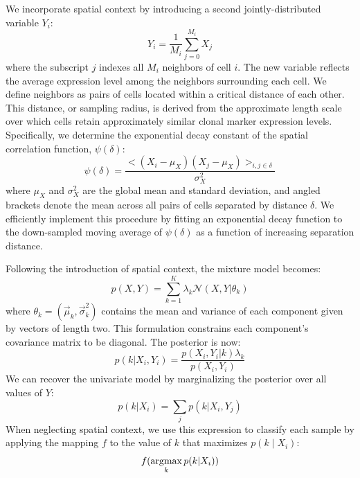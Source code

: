 We incorporate spatial context by introducing a second jointly-distributed variable $Y_i$:
\begin{equation}
Y_i = \frac{1}{M_i} \sum^{M_i}_{j=0} X_j
\end{equation}
where the subscript $j$ indexes all $M_i$ neighbors of cell $i$. The new variable reflects the average expression level among the neighbors surrounding each cell. We define neighbors as pairs of cells located within a critical distance of each other. This distance, or sampling radius, is derived from the approximate length scale over which cells retain approximately similar clonal marker expression levels. Specifically, we determine the exponential decay constant of the spatial correlation function, $\psi (\delta)$:
\begin{equation}
\psi(\delta) = \frac {<( X_i -\mu_{X})( X_j -\mu_{X})>_{i,j \in \delta}} {\sigma_X^2}
\end{equation}
where $\mu_X$ and $\sigma_X^2$ are the global mean and standard deviation, and angled brackets denote the mean across all pairs of cells separated by distance $\delta$. We efficiently implement this procedure by fitting an exponential decay function to the down-sampled moving average of $\psi (\delta)$ as a function of increasing separation distance.

Following the introduction of spatial context, the mixture model becomes:
\begin{equation}
\label{eq:bivariate_mixture}
p(X, Y) = \sum^{K}_{k=1}\lambda_k \mathcal{N}( X,Y |\theta_{k})
\end{equation}
where $\theta_{k} = (\vec{\mu}_{k},\vec{\sigma}_{k}^2)$ contains the mean and variance of each component given by vectors of length two. This formulation constrains each component's covariance matrix to be diagonal. The posterior is now:
\begin{equation}
p(k| X_i,Y_i) = \frac{p(X_i, Y_i | k) \lambda_k}{p(X_i, Y_i)}
\end{equation}
We can recover the univariate model by marginalizing the posterior over all values of $Y$:
\begin{equation}
p(k| X_i) = \sum_{j} p(k| X_i,Y_j)
\end{equation}
When neglecting spatial context, we use this expression to classify each sample by applying the mapping $f$ to the value of $k$ that maximizes $p(k \mid X_i)$:
\begin{equation}
f(\operatorname*{\arg\!\max}_{k} p(k | X_i))
\end{equation}

